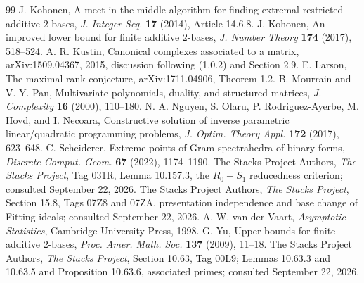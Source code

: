 \begin{thebibliography}{99}
 J. Kohonen, A meet-in-the-middle algorithm for finding extremal restricted additive $2$-bases, \emph{J. Integer Seq.} \textbf{17} (2014), Article 14.6.8.
 J. Kohonen, An improved lower bound for finite additive $2$-bases, \emph{J. Number Theory} \textbf{174} (2017), 518--524.
 A. R. Kustin, Canonical complexes associated to a matrix, arXiv:1509.04367, 2015, discussion following (1.0.2) and Section 2.9.
 E. Larson, The maximal rank conjecture, arXiv:1711.04906, Theorem 1.2.
 B. Mourrain and V. Y. Pan, Multivariate polynomials, duality, and structured matrices, \emph{J. Complexity} \textbf{16} (2000), 110--180.
 N. A. Nguyen, S. Olaru, P. Rodriguez-Ayerbe, M. Hovd, and I. Necoara, Constructive solution of inverse parametric linear/quadratic programming problems, \emph{J. Optim. Theory Appl.} \textbf{172} (2017), 623--648.
 C. Scheiderer, Extreme points of Gram spectrahedra of binary forms, \emph{Discrete Comput. Geom.} \textbf{67} (2022), 1174--1190.
 The Stacks Project Authors, \emph{The Stacks Project}, Tag 031R, Lemma 10.157.3, the $R_0+S_1$ reducedness criterion; consulted September 22, 2026.
 The Stacks Project Authors, \emph{The Stacks Project}, Section 15.8, Tags 07Z8 and 07ZA, presentation independence and base change of Fitting ideals; consulted September 22, 2026.
 A. W. van der Vaart, \emph{Asymptotic Statistics}, Cambridge University Press, 1998.
 G. Yu, Upper bounds for finite additive $2$-bases, \emph{Proc. Amer. Math. Soc.} \textbf{137} (2009), 11--18.
 The Stacks Project Authors, \emph{The Stacks Project}, Section 10.63, Tag 00L9; Lemmas 10.63.3 and 10.63.5 and Proposition 10.63.6, associated primes; consulted September 22, 2026.
\end{thebibliography}
